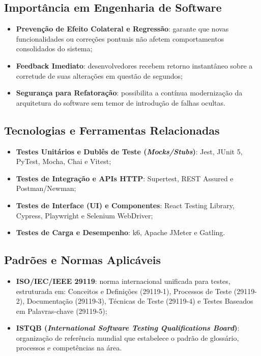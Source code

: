 \documentclass[12pt,a4paper]{article}
\begin{document}
\subsection{Importância em Engenharia de Software}
\begin{itemize}
    \item \textbf{Prevenção de Efeito Colateral e Regressão}: garante que novas funcionalidades ou correções pontuais não afetem comportamentos consolidados do sistema;
    \item \textbf{Feedback Imediato}: desenvolvedores recebem retorno instantâneo sobre a corretude de suas alterações em questão de segundos;
    \item \textbf{Segurança para Refatoração}: possibilita a contínua modernização da arquitetura do software sem temor de introdução de falhas ocultas.
\end{itemize}

\subsection{Tecnologias e Ferramentas Relacionadas}
\begin{itemize}
    \item \textbf{Testes Unitários e Dublês de Teste (\textit{Mocks/Stubs})}: Jest, JUnit 5, PyTest, Mocha, Chai e Vitest;
    \item \textbf{Testes de Integração e APIs HTTP}: Supertest, REST Assured e Postman/Newman;
    \item \textbf{Testes de Interface (UI) e Componentes}: React Testing Library, Cypress, Playwright e Selenium WebDriver;
    \item \textbf{Testes de Carga e Desempenho}: k6, Apache JMeter e Gatling.
\end{itemize}

\subsection{Padrões e Normas Aplicáveis}
\begin{itemize}
    \item \textbf{ISO/IEC/IEEE 29119}: norma internacional unificada para testes, estruturada em: Conceitos e Definições (29119-1), Processos de Teste (29119-2), Documentação (29119-3), Técnicas de Teste (29119-4) e Testes Baseados em Palavras-chave (29119-5);
    \item \textbf{ISTQB (\textit{International Software Testing Qualifications Board})}: organização de referência mundial que estabelece o padrão de glossário, processos e competências na área.
\end{itemize}
\end{document}
